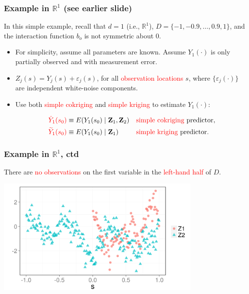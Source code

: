 \documentclass{beamer}
\newcommand{\Zvec}{\mathbf{Z}}
\newcommand{\E}{E}
\begin{document}

\begin{frame}
\frametitle{Example in $\mathbb{R}^1$ (see earlier slide)}
In this simple example, recall that $d=1$ (i.e., $\mathbb{R}^1$), $D=\{-1,-0.9,\ldots,0.9,1\}$, and the interaction function $b_o$ is not symmetric about $0$.
\begin{itemize}
\item For simplicity, assume all parameters are known. Assume $Y_1(\cdot)$ is only partially observed and with measurement error.
\item $Z_j(s)=Y_j(s)+\varepsilon_j(s)$, for all \textcolor{red}{observation locations} $s$, where $\{\varepsilon_j(\cdot)\}$ are independent white-noise components.
\item Use both \textcolor{red}{simple cokriging} and \textcolor{red}{simple kriging} to estimate $Y_1(\cdot)$:

\begin{align*}
\textcolor{red}{\hat Y_1(s_0)} &\equiv \E(Y_1(s_0) \mid  \Zvec_1, \Zvec_2)&&\textrm{\textcolor{red}{simple cokriging} predictor}, \\
\textcolor{red}{\widetilde Y_1(s_0)} &\equiv \E(Y_1(s_0) \mid  \Zvec_1)&&\textrm{\textcolor{red}{simple kriging} predictor}.
\end{align*}\vfill
\end{itemize}

\end{frame}


\begin{frame}
\frametitle{Example in $\mathbb{R}^1$, ctd}
There are \textcolor{red}{no observations} on the first variable in the \textcolor{red}{left-hand half} of $D$.
\begin{center}
\includegraphics[width=4in]{./sim_obs.png}
\end{center}
\end{frame}
\end{document}
